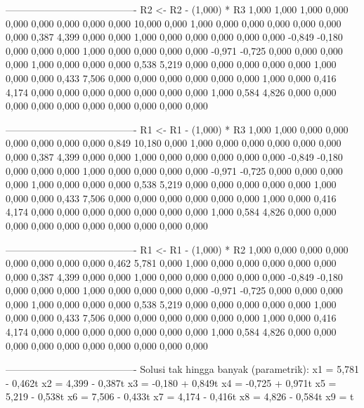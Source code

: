 \documentclass[12pt]{article}
\begin{document}
\begin{enumerate}
\begin{keluaran}
----------------------------------------
R2 <- R2 - (1,000) * R3
1,000   1,000   1,000   0,000   0,000   0,000   0,000   0,000   0,000   10,000
0,000   1,000   0,000   0,000   0,000   0,000   0,000   0,000   0,387   4,399
0,000   0,000   1,000   0,000   0,000   0,000   0,000   0,000   -0,849  -0,180
0,000   0,000   0,000   1,000   0,000   0,000   0,000   0,000   -0,971  -0,725
0,000   0,000   0,000   0,000   1,000   0,000   0,000   0,000   0,538   5,219
0,000   0,000   0,000   0,000   0,000   1,000   0,000   0,000   0,433   7,506
0,000   0,000   0,000   0,000   0,000   0,000   1,000   0,000   0,416   4,174
0,000   0,000   0,000   0,000   0,000   0,000   0,000   1,000   0,584   4,826
0,000   0,000   0,000   0,000   0,000   0,000   0,000   0,000   0,000   0,000

----------------------------------------
R1 <- R1 - (1,000) * R3
1,000   1,000   0,000   0,000   0,000   0,000   0,000   0,000   0,849   10,180
0,000   1,000   0,000   0,000   0,000   0,000   0,000   0,000   0,387   4,399
0,000   0,000   1,000   0,000   0,000   0,000   0,000   0,000   -0,849  -0,180
0,000   0,000   0,000   1,000   0,000   0,000   0,000   0,000   -0,971  -0,725
0,000   0,000   0,000   0,000   1,000   0,000   0,000   0,000   0,538   5,219
0,000   0,000   0,000   0,000   0,000   1,000   0,000   0,000   0,433   7,506
0,000   0,000   0,000   0,000   0,000   0,000   1,000   0,000   0,416   4,174
0,000   0,000   0,000   0,000   0,000   0,000   0,000   1,000   0,584   4,826
0,000   0,000   0,000   0,000   0,000   0,000   0,000   0,000   0,000   0,000

----------------------------------------
R1 <- R1 - (1,000) * R2
1,000   0,000   0,000   0,000   0,000   0,000   0,000   0,000   0,462   5,781
0,000   1,000   0,000   0,000   0,000   0,000   0,000   0,000   0,387   4,399
0,000   0,000   1,000   0,000   0,000   0,000   0,000   0,000   -0,849  -0,180
0,000   0,000   0,000   1,000   0,000   0,000   0,000   0,000   -0,971  -0,725
0,000   0,000   0,000   0,000   1,000   0,000   0,000   0,000   0,538   5,219
0,000   0,000   0,000   0,000   0,000   1,000   0,000   0,000   0,433   7,506
0,000   0,000   0,000   0,000   0,000   0,000   1,000   0,000   0,416   4,174
0,000   0,000   0,000   0,000   0,000   0,000   0,000   1,000   0,584   4,826
0,000   0,000   0,000   0,000   0,000   0,000   0,000   0,000   0,000   0,000

----------------------------------------
Solusi tak hingga banyak (parametrik):
x1 = 5,781 - 0,462t
x2 = 4,399 - 0,387t
x3 = -0,180 + 0,849t
x4 = -0,725 + 0,971t
x5 = 5,219 - 0,538t
x6 = 7,506 - 0,433t
x7 = 4,174 - 0,416t
x8 = 4,826 - 0,584t
x9 = t


\end{keluaran}
\end{enumerate}
\end{document}

